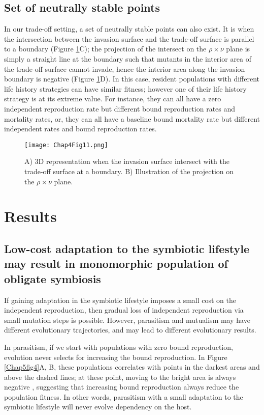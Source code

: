 \documentclass[11.5pt]{article}
\begin{document}
\subsection{Set of neutrally stable points}

In our trade-off setting, a set of neutrally stable points can also exist. It is when the intersection between the invasion surface and the trade-off surface is parallel to a boundary (Figure \ref{Chap5fig11}C); the projection of the intersect on the $\rho \times \nu$ plane is simply a straight line at the boundary such that mutants in the interior area of the trade-off surface cannot invade, hence the interior area along the invasion boundary is negative  (Figure \ref{Chap5fig11}D). In this case, resident populations with different life history strategies can have similar fitness; however one of their life history strategy is at its extreme value. For instance, they can all have a zero independent reproduction rate but different bound reproduction rates and mortality rates, or, they can all have a baseline bound mortality rate but different independent rates and bound reproduction rates.

\begin{figure}[H]
    \centering
    \texttt{[image: Chap4Fig11.png]}
    \caption[Set of neutrally stable points]{A) 3D representation when the invasion surface intersect with the trade-off surface at a boundary. B) Illustration of the projection on the $\rho \times \nu$ plane.}
    \label{Chap5fig11}
\end{figure}

\section{Results}
\subsection{Low-cost adaptation to the symbiotic lifestyle may result in monomorphic population of obligate symbiosis}
If gaining adaptation in the symbiotic lifestyle imposes a small cost on the independent reproduction, then gradual loss of independent reproduction via small mutation steps is possible. However, parasitism and mutualism may have different evolutionary trajectories, and may lead to different evolutionary results. 

\medskip

In parasitism, if we start with populations with zero bound reproduction, evolution never selects for increasing the bound reproduction. In Figure \ref{Chap5fig4}A, B, these populations correlates with points in the darkest areas and above the dashed lines; at these point, moving to the bright area is always negative , suggesting that increasing bound reproduction always reduce the population fitness. In other words, parasitism with a small adaptation to the symbiotic lifestyle will never evolve dependency on the host. 
\end{document}
